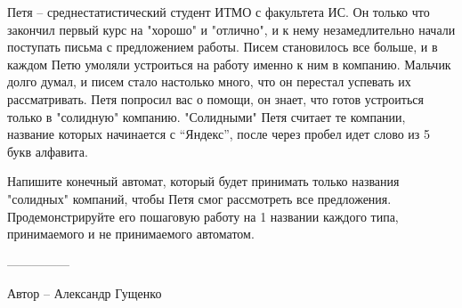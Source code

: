 \question
Петя -- среднестатистический студент ИТМО с факультета ИС. Он только что закончил первый курс на "хорошо" и "отлично", и к нему незамедлительно начали поступать письма с предложением работы. Писем становилось все больше, и в каждом Петю умоляли устроиться на работу именно к ним в компанию. Мальчик долго думал, и писем стало настолько много, что он перестал успевать их рассматривать. Петя попросил вас о помощи, он знает, что готов устроиться только в "солидную" компанию. "Солидными" Петя считает те компании, название которых начинается с “Яндекс”, после через пробел идет слово из 5 букв алфавита. 

Напишите конечный автомат, который будет принимать только названия "солидных" компаний, чтобы Петя смог рассмотреть все предложения. Продемонстрируйте его пошаговую работу на 1 названии каждого типа, принимаемого и не принимаемого автоматом.

---------------

Автор -- Александр Гущенко
